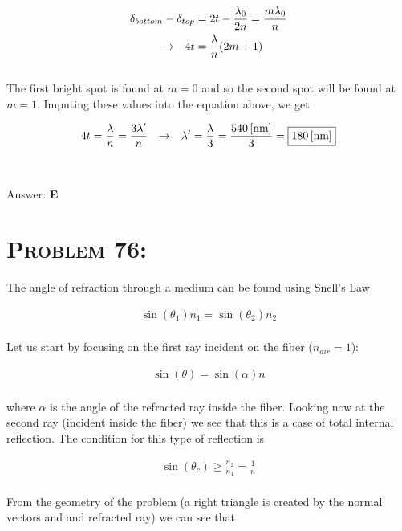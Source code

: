 \documentclass{article}
\begin{document}
\begin{align}
\delta_{bottom} - \delta_{top} &= 2t - \frac{\lambda_{0}}{2n}  = \frac{m\lambda_{0}}{n}\nonumber\\
\rightarrow \hspace{.1in} 4t &= \frac{\lambda}{n} (2m +1)\nonumber
\end{align}
\\
The first bright spot is found at $m=0$ and so the second spot will be found at $m = 1$. Imputing these values into the equation above, we get

\begin{align}
4 t =  \frac{\lambda}{n} = \frac{3 \lambda '}{n}  \hspace{.1in} \rightarrow  \hspace{.1in} \lambda ' = \frac{\lambda}{3} = \frac{\unit[540]{[nm]}}{3} =\boxed{\unit[180]{[nm]}}\nonumber
\end{align}
\\\\
Answer: \textbf{\textcolor{ProcessBlue}E}\\


\section{\textsc{Problem 76:}} The angle of refraction through a medium can be found using Snell's Law

\begin{align}
\sin{(\theta_{1})}  n_{1} =  \sin{(\theta_{2})}n_{2}
\end{align}
\\
Let us start by focusing on the first ray incident on the fiber ($n_{air} = 1$):

\begin{align}
 \sin{(\theta)}= \sin{(\alpha)}n \nonumber
\end{align}
\\
where $\alpha$ is the angle of the refracted ray inside the fiber. Looking now at the second ray (incident inside the fiber) we see that this is a case of total internal reflection. The condition for this type of reflection is

\begin{align}
\sin{(\theta_{c})} \geq \frac{n_{2}}{n_{1}} = \frac{1}{n}
\end{align}
\\
From the geometry of the problem (a right triangle is created by the normal vectors and and refracted ray) we can see that
\end{document}

